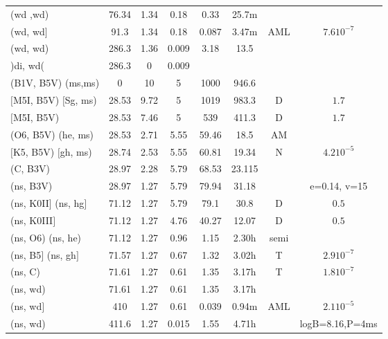 \documentclass{article}
\begin{document}
\begin{table}
\begin{tabular}{p{4cm}ccccccc}
(wd ,wd)	 	& 76.34	& 1.34	& 0.18	& 0.33	& 25.7m	& 	&			\\
(wd, wd$]$	 	& 91.3	& 1.34	& 0.18	& 0.087	& 3.47m	& AML	& $7.6 10^{-7}$		\\
(wd, wd)	 	& 286.3	& 1.36	& 0.009	& 3.18	& 13.5	& 	&			\\
)di, wd(	 	& 286.3	& 0	& 0.009	&	&	&	& 			\\ \hline
(B1V, B5V) (ms,ms)	& 0	& 10	& 5	& 1000	& 946.6	&	&			\\
$[$M5I, B5V) $[$Sg, ms)	& 28.53	& 9.72 	& 5	& 1019	& 983.3	& D	& $1.7$				\\
$[$M5I, B5V)	 	& 28.53	& 7.46	& 5	& 539	& 411.3	& D	& $1.7$			\\
(O6, B5V) (he, ms)	& 28.53	& 2.71	& 5.55	& 59.46	& 18.5	& AM	&			\\
$[$K5, B5V) $[$gh, ms)	& 28.74	& 2.53	& 5.55	& 60.81	& 19.34	& N	& $4.2 10^{-5}$		\\
(C, B3V) 	 	& 28.97	& 2.28	& 5.79	& 68.53	& 23.115&	&			\\
(ns, B3V)	 	& 28.97	& 1.27	& 5.79	& 79.94	& 31.18	&	& e=0.14, v=15		\\
(ns, K0II$]$ (ns, hg$]$	& 71.12	& 1.27	& 5.79	& 79.1	& 30.8	& D	& $0.5$			\\
(ns, K0III$]$	 	& 71.12	& 1.27	& 4.76	& 40.27	& 12.07	& D	& $0.5$			\\
(ns, O6) (ns, he)	& 71.12	& 1.27	& 0.96	& 1.15	& 2.30h	& semi	&			\\
(ns, B5$]$ (ns, gh$]$	& 71.57	& 1.27	& 0.67	& 1.32	& 3.02h	& T	& $2.9 10^{-7}$		\\
(ns, C) 	 	& 71.61	& 1.27	& 0.61	& 1.35	& 3.17h	& T	& $1.8 10^{-7}$		\\
(ns, wd)	 	& 71.61	& 1.27	& 0.61	& 1.35	& 3.17h	&	&			\\
(ns, wd$]$	 	& 410	& 1.27	& 0.61	& 0.039	& 0.94m	& AML  	& $2.1 10^{-5}$   	\\
(ns, wd)	 	& 411.6	& 1.27	& 0.015	& 1.55	& 4.71h	& 	& logB=8.16,P=4ms	\\ \hline
\end{tabular}
\end{table}
\end{document}
